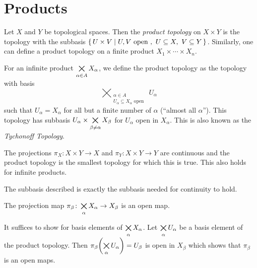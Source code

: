 \documentclass[letterpaper, 11pt, oneside]{book}
\begin{document}
\clearpage

\chapter{Products}

\begin{defn}
  Let $X$ and $Y$ be topological spaces.
  Then the \emph{product topology} on $X \times Y$ is the topology with the subbasis $\set{U \times V | U, V \text{ open },~ U \subseteq X,~ V \subseteq Y}$.
  Similarly, one can define a product topology on a finite product $X_{1} \times \cdots \times X_{n}$.

  For an infinite product $\bigtimes\limits_{\alpha \in A} X_{\alpha}$, we define the product topology as the topology with basis
  \[
    \bigtimes_{\substack{\alpha \in A \\ U_{\alpha} \subseteq X_{\alpha} \text{ open }}} U_{\alpha}
  \]
  such that $U_{\alpha} = X_{\alpha}$ for all but a finite number of $\alpha$ (``almost all $\alpha$'').
  This topology has subbasis $U_{\alpha} \times \bigtimes\limits_{\beta \neq \alpha} X_{\beta}$ for $U_{\alpha}$ open in $X_{\alpha}$.
  This is also known as the \emph{Tychonoff Topology}.
\end{defn}

\begin{prop}
  The projections $\pi_{X}\colon X \times Y \to X$ and $\pi_{Y}\colon X \times Y \to Y$ are continuous and the product topology is the smallest topology for which this is true.
  This also holds for infinite products.
\end{prop}
\begin{pf}
  The subbasis described is exactly the subbasis needed for continuity to hold.
\end{pf}

\begin{prop}
  The projection map $\pi_{\beta}\colon \bigtimes\limits_{\alpha} X_{\alpha} \to X_{\beta}$ is an open map.
\end{prop}
\begin{pf}
  It suffices to show for basis elements of $\bigtimes\limits_{\alpha} X_{\alpha}$.
  Let $\bigtimes\limits_{\alpha} U_{\alpha}$ be a basis element of the product topology.
  Then $\pi_{\beta}\pqty{\Bigtimes_{\alpha} U_{\alpha}} = U_{\beta}$ is open in $X_{\beta}$ which shows that $\pi_{\beta}$ is an open maps.
\end{pf}

\clearpage
\end{document}
